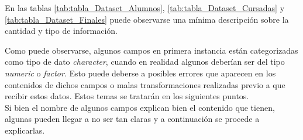 

En las tablas \ref{tab:tabla_Dataset_Alumnos}, \ref{tab:tabla_Dataset_Cursadas} y \ref{tab:tabla_Dataset_Finales} puede observarse una mínima descripción sobre la cantidad y  tipo de información. 

\vspace{3mm}







\vspace{3mm}

Como puede observarse, algunos campos en primera instancia están categorizadas como tipo de dato \textit{character}, cuando en realidad algunos deberían ser del tipo \textit{numeric} o \textit{factor}.
Esto puede deberse a posibles errores que aparecen en los contenidos de dichos campos o malas transformaciones realizadas previo a que recibir estos datos. Estos temas se tratarán en los siguientes puntos.
\\
Si bien el nombre de algunos campos explican bien el contenido que tienen, algunas pueden llegar a no ser tan claras y a continuación se procede a explicarlas.


